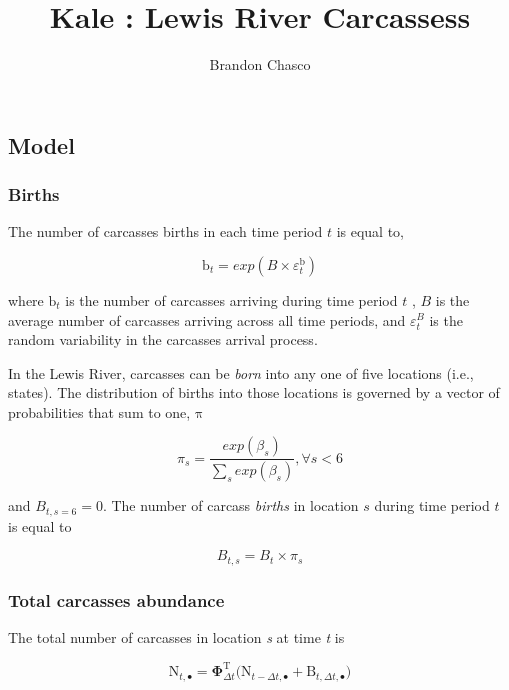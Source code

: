 \documentclass[
  letterpaper,
  DIV=11,
  numbers=noendperiod]{scrartcl}
\title{Kale : Lewis River Carcassess}
\author{Brandon Chasco}
\date{}
\begin{document}
\maketitle
\ifdefined\Shaded\renewenvironment{Shaded}{\begin{tcolorbox}[borderline west={3pt}{0pt}{shadecolor}, boxrule=0pt, interior hidden, sharp corners, breakable, enhanced, frame hidden]}{\end{tcolorbox}}\fi

\hypertarget{model}{%
\subsection{Model}\label{model}}

\hypertarget{births}{%
\subsubsection{Births}\label{births}}

The number of carcasses births in each time period \(t\) is equal to,

\[
\mathrm{b}_t =exp(B\times\varepsilon^\mathrm{b}_t)
\]

where \(\mathrm{b}_t\) is the number of carcasses arriving during time
period \(t\) , \(B\) is the average number of carcasses arriving across
all time periods, and \(\varepsilon^B_t\) is the random variability in
the carcasses arrival process.

In the Lewis River, carcasses can be \emph{born} into any one of five
locations (i.e., states). The distribution of births into those
locations is governed by a vector of probabilities that sum to one,
\(\boldsymbol{\mathrm{\pi}}\)

\[
\pi_s = \frac{exp(\beta_s)}{\sum_s exp(\beta_s)}, \forall s<6
\]

and \(B_{t,s=6} = 0\). The number of carcass \emph{births} in location
\(s\) during time period \(t\) is equal to

\[
B_{t,s} = B_t\times\pi_s
\]

\hypertarget{total-carcasses-abundance}{%
\subsubsection{Total carcasses
abundance}\label{total-carcasses-abundance}}

The total number of carcasses in location \emph{s} at time \emph{t} is

\[
\mathbf{\mathrm{N}}_{t,\bullet} = \boldsymbol{\Phi}_{\Delta t}^\mathrm{T}\bigr(\mathbf{\mathrm{N}}_{t-\Delta t,\bullet}  + \mathbf{\mathrm{B}}_{t,\Delta t,\bullet}\bigr)
\]
\end{document}
